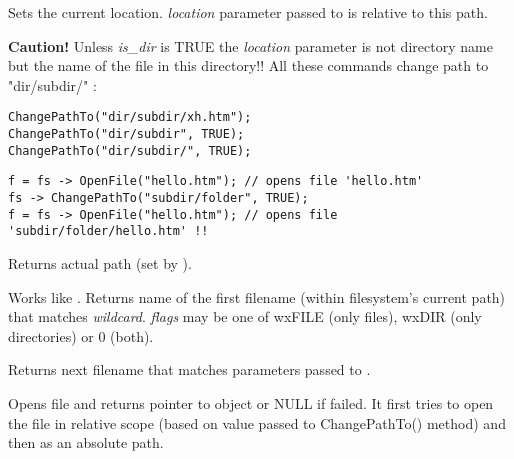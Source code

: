 Sets the current location. {\it location} parameter passed to 
 is relative to this path.

{\bf Caution! } Unless {\it is\_dir} is TRUE the {\it location} parameter
is not directory name but the name of the file in this directory!! All these
commands change path to "dir/subdir/" :

\begin{verbatim}
ChangePathTo("dir/subdir/xh.htm");
ChangePathTo("dir/subdir", TRUE);
ChangePathTo("dir/subdir/", TRUE);
\end{verbatim}





\begin{verbatim}
f = fs -> OpenFile("hello.htm"); // opens file 'hello.htm'
fs -> ChangePathTo("subdir/folder", TRUE);
f = fs -> OpenFile("hello.htm"); // opens file 'subdir/folder/hello.htm' !!
\end{verbatim}

\label{wxfilesystemgetpath}


Returns actual path (set by ).


\label{wxfilesystemfindfirst}


Works like . Returns name of the first
filename (within filesystem's current path) that matches {\it wildcard}. {\it flags} may be one of
wxFILE (only files), wxDIR (only directories) or 0 (both).

\label{wxfilesystemfindnext}


Returns next filename that matches parameters passed to .


\label{wxfilesystemopenfile}


Opens file and returns pointer to  object
or NULL if failed. It first tries to open the file in relative scope
(based on value passed to ChangePathTo() method) and then as an
absolute path.

